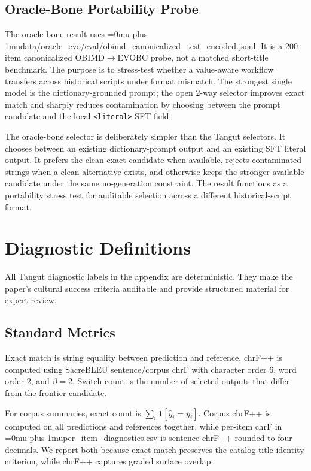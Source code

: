 \documentclass{article}
\newcommand{\code}[1]{\texttt{#1}}
\newcommand{\pathcode}[1]{{\begingroup\Urlmuskip=0mu plus 1mu\url{#1}\endgroup}}
\begin{document}
\subsection{Oracle-Bone Portability Probe}

The oracle-bone result uses \pathcode{data/oracle_evo/eval/obimd_canonicalized_test_encoded.jsonl}. It is a 200-item canonicalized OBIMD$\rightarrow$EVOBC probe, not a matched short-title benchmark. The purpose is to stress-test whether a value-aware workflow transfers across historical scripts under format mismatch. The strongest single model is the dictionary-grounded prompt; the open 2-way selector improves exact match and sharply reduces contamination by choosing between the prompt candidate and the local \code{<literal>} SFT field.

The oracle-bone selector is deliberately simpler than the Tangut selectors. It chooses between an existing dictionary-prompt output and an existing SFT literal output. It prefers the clean exact candidate when available, rejects contaminated strings when a clean alternative exists, and otherwise keeps the stronger available candidate under the same no-generation constraint. The result functions as a portability stress test for auditable selection across a different historical-script format.

\section{Diagnostic Definitions}

All Tangut diagnostic labels in the appendix are deterministic. They make the paper's cultural success criteria auditable and provide structured material for expert review.

\subsection{Standard Metrics}

Exact match is string equality between prediction and reference. chrF++ is computed using SacreBLEU sentence/corpus chrF with character order 6, word order 2, and $\beta=2$. Switch count is the number of selected outputs that differ from the frontier candidate.

For corpus summaries, exact count is \(\sum_i \mathbf{1}[\hat{y}_i=y_i]\). Corpus chrF++ is computed on all predictions and references together, while per-item chrF in \pathcode{per_item_diagnostics.csv} is sentence chrF++ rounded to four decimals. We report both because exact match preserves the catalog-title identity criterion, while chrF++ captures graded surface overlap.
\end{document}

